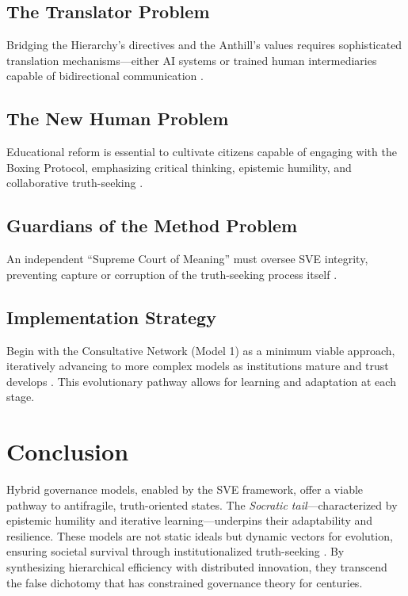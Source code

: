 \documentclass[11pt,a4paper]{article}
\begin{document}
\begin{small}
\subsection{The Translator Problem}
Bridging the Hierarchy's directives and the Anthill's values requires sophisticated translation mechanisms—either AI systems or trained human intermediaries capable of bidirectional communication \citep[lines 2320--2322]{HybridModelsMemo}.

\subsection{The New Human Problem}
Educational reform is essential to cultivate citizens capable of engaging with the Boxing Protocol, emphasizing critical thinking, epistemic humility, and collaborative truth-seeking \citep[lines 2323--2326]{HybridModelsMemo}.

\subsection{Guardians of the Method Problem}
An independent ``Supreme Court of Meaning'' must oversee SVE integrity, preventing capture or corruption of the truth-seeking process itself \citep[lines 2327--2331]{HybridModelsMemo}.

\subsection{Implementation Strategy}
Begin with the Consultative Network (Model 1) as a minimum viable approach, iteratively advancing to more complex models as institutions mature and trust develops \citep[lines 2335--2336]{HybridModelsMemo}. This evolutionary pathway allows for learning and adaptation at each stage.

\section{Conclusion}
Hybrid governance models, enabled by the SVE framework, offer a viable pathway to antifragile, truth-oriented states. The \textit{Socratic tail}—characterized by epistemic humility and iterative learning—underpins their adaptability and resilience. These models are not static ideals but dynamic vectors for evolution, ensuring societal survival through institutionalized truth-seeking \citep[lines 2337--2338]{HybridModelsMemo}. By synthesizing hierarchical efficiency with distributed innovation, they transcend the false dichotomy that has constrained governance theory for centuries.


\end{small}
\end{document}
